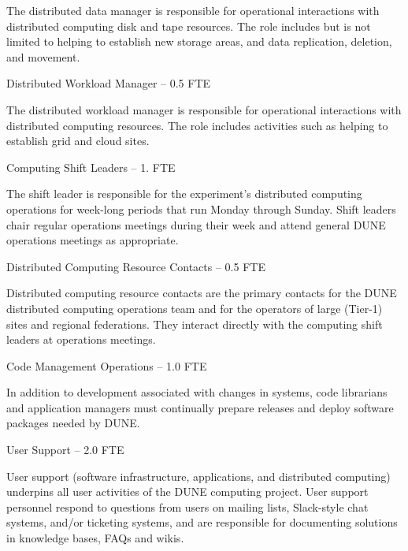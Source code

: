 \documentclass[../main-v1.tex]{subfiles}
\begin{document}
\begin{description}
The distributed data manager is responsible for operational interactions with distributed computing disk and tape resources. The role includes but is not limited to helping to establish new storage areas, and data replication, deletion, and movement. 

\item {Distributed Workload Manager -- 0.5 FTE}

The distributed workload manager is responsible for operational interactions with distributed computing resources. The role includes activities such as helping to establish grid and cloud sites. 


\item {Computing Shift Leaders -- 1. FTE}

The shift leader is %
responsible for the experiment's distributed computing operations for %
week-long periods that run Monday through Sunday.  %
Shift leaders chair regular operations meetings during their week and attend general DUNE operations meetings as appropriate. %

\item {Distributed Computing Resource Contacts -- 0.5 FTE}

Distributed computing resource contacts are the primary contacts for the DUNE distributed computing operations team and for the operators of large (Tier-1) sites and regional federations. They interact directly with the computing shift leaders at operations meetings. 


\item {Code Management Operations -- 1.0 FTE}

In addition to development associated with changes in systems, code librarians and application managers must continually prepare releases and %
deploy  software packages needed by DUNE.  

\item {User Support -- 2.0 FTE}

User support (software infrastructure, applications, and distributed computing) underpins all user activities of the DUNE computing project. 
User support %
personnel %
respond to questions from users on mailing lists, Slack-style chat systems, and/or ticketing systems, %
and are responsible for documenting solutions in knowledge bases, FAQs and wikis. %


\end{description}
\end{document}
